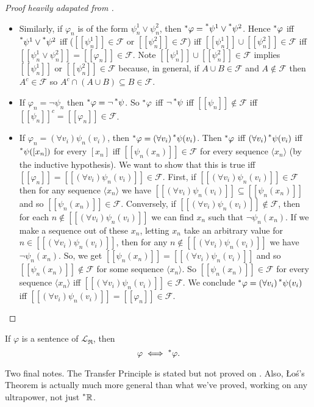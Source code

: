 \begin{proof}[Proof heavily adapated from ]
\begin{itemize}
        \item Similarly, if $\varphi_n$ is of the form $\psi^1_n \lor \psi^2_n$, then $\prescript{*}{}{\varphi} = \prescript{*}{}{\psi^1} \lor \prescript{*}{}{\psi^2}$. Hence $\prescript{*}{}{\varphi}$ iff $\prescript{*}{}{\psi^1} \lor \prescript{*}{}{\psi^2}$ iff ($[[\psi^1_n]] \in \mathcal {F}$ or $[[\psi^2_n]] \in \mathcal{F}$) iff $[[\psi^1_n]] \cup [[\psi^2_n]] \in \mathcal{F}$ iff $[[\psi^1_n \lor \psi^2_n]] = [[\varphi_n]] \in \mathcal{F}$. Note $[[\psi^1_n]] \cup [[\psi^2_n]] \in \mathcal{F}$ implies $[[\psi^1_n]]$ or $[[\psi^2_n]] \in \mathcal{F}$ because, in general, if $A \cup B \in \mathcal{F}$ and $A \notin \mathcal{F}$ then $A^c \in \mathcal{F}$ so $A^c \cap (A \cup B) \subseteq B \in \mathcal{F}$.
        
        \item If $\varphi_n = \neg \psi_n$ then $\prescript{*}{}{\varphi} = \neg \prescript{*}{}{\psi}$. So $\prescript{*}{}{\varphi}$ iff $\neg \prescript{*}{}{\psi}$ iff $[[\psi_n]] \notin \mathcal{F}$ iff $[[\psi_n]]^c = [[\varphi_n]] \in \mathcal{F}$.
        
        \item If $\varphi_n = (\forall v_i)\psi_n(v_i)$, then $\prescript{*}{}{\varphi} = (\forall v_i) \prescript{*}{}{\psi}(v_i)$. Then $\prescript{*}{}{\varphi}$ iff $(\forall v_i)\prescript{*}{}{\psi}(v_i)$ iff $\prescript{*}{}{\psi}([x_n])$ for every $[x_n]$ iff $[[\psi_n(x_n)]] \in \mathcal{F}$ for every sequence $\langle x_n \rangle$ (by the inductive hypothesis). We want to show that this is true iff $[[\varphi_n]] = [[(\forall v_i)\psi_n(v_i)]] \in \mathcal{F}$. First, if $[[(\forall v_i)\psi_n(v_i)]] \in \mathcal{F}$ then for any sequence $\langle x_n \rangle$ we have $[[(\forall v_i)\psi_n(v_i)]] \subseteq [[\psi_n(x_n)]]$ and so $[[\psi_n(x_n)]] \in \mathcal{F}$. Conversely, if $[[(\forall v_i)\psi_n(v_i)]] \notin \mathcal{F}$, then for each $n \notin [[(\forall v_i)\psi_n(v_i)]]$ we can find $x_n$ such that $\neg \psi_n(x_n)$. If we make a sequence out of these $x_n$, letting $x_n$ take an arbitrary value for $n \in [[(\forall v_i)\psi_n(v_i)]]$, then for any $n \notin [[(\forall v_i)\psi_n(v_i)]]$ we have $\neg \psi_n(x_n)$. So, we get $[[\psi_n(x_n)]] = [[(\forall v_i)\psi_n(v_i)]]$ and so $[[\psi_n(x_n)]] \notin \mathcal{F}$ for some sequence $\langle x_n \rangle$. So $[[\psi_n(x_n)]] \in \mathcal{F}$ for every sequence $\langle x_n \rangle$ iff $[[(\forall v_i)\psi_n(v_i)]] \in \mathcal{F}$. We conclude $\prescript{*}{}{\varphi} = (\forall v_i)\prescript{*}{}{\psi}(v_i)$ iff $[[(\forall v_i)\psi_n(v_i)]] = [[\varphi_n]] \in \mathcal{F}$.
    \end{itemize}
\end{proof}

\begin{corollary}\label{transferPrinciple}
    If $\varphi$ is a sentence of $\mathcal{L}_\mathfrak{R}$, then
    \[ \varphi \iff \prescript{*}{}{\varphi}. \]
\end{corollary}
Two final notes. The Transfer Principle is stated but not proved on \cite[44]{goldblatt1998}.  Also, \L o\'s's Theorem is actually much more general than what we've proved, working on any ultrapower, not just $\prescript{*}{}{\mathbb{R}}$.
